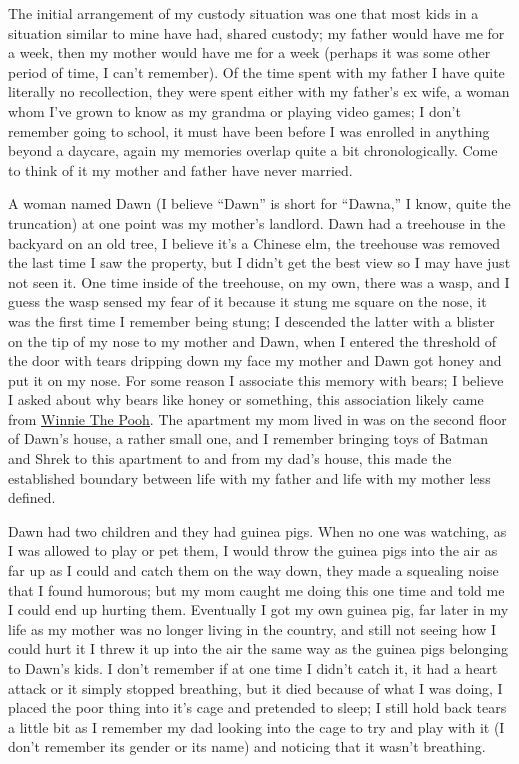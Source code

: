 \documentclass[12pt]{article}
\begin{document}
The initial arrangement of my custody situation was one that most kids in a
situation similar to mine have had, shared custody; my father would have me for
a week, then my mother would have me for a week (perhaps it was some other
period of time, I can't remember).  Of the time spent with my father I have
quite literally no recollection, they were spent either with my father's ex
wife, a woman whom I've grown to know as my grandma or playing video games; I
don't remember going to school, it must have been before I was enrolled in
anything beyond a daycare, again my memories overlap quite a bit
chronologically.  Come to think of it my mother and father have never married.

A woman named Dawn (I believe ``Dawn'' is short for ``Dawna,'' I know, quite
the truncation) at one point was my mother's landlord.  Dawn had a treehouse in
the backyard on an old tree, I believe it's a Chinese elm, the treehouse was
removed the last time I saw the property, but I didn't get the best view so I
may have just not seen it.  One time inside of the treehouse, on my own, there
was a wasp, and I guess the wasp sensed my fear of it because it stung me
square on the nose, it was the first time I remember being stung; I descended
the latter with a blister on the tip of my nose to my mother and Dawn, when I
entered the threshold of the door with tears dripping down my face my mother
and Dawn got honey and put it on my nose.  For some reason I associate this
memory with bears; I believe I asked about why bears like honey or something,
this association likely came from
{\color{blue}\underline{\href{https://winniethepooh.disney.com/}{Winnie The
Pooh}}}.  The apartment my mom lived in was on the second floor of Dawn's
house, a rather small one, and I remember bringing toys of Batman and Shrek to
this apartment to and from my dad's house, this made the established boundary
between life with my father and life with my mother less defined.

Dawn had two children and they had guinea pigs. When no one was watching, as
I was allowed to play or pet them, I would throw the guinea pigs into the air as
far up as I could and catch them on the way down, they made a squealing noise
that I found humorous; but my mom caught me doing this one time and told me
I could end up hurting them.  Eventually I got my own guinea pig, far later in
my life as my mother was no longer living in the country, and still not seeing
how I could hurt it I threw it up into the air the same way as the guinea pigs
belonging to Dawn's kids.  I don't remember if at one time I didn't catch it, it
had a heart attack or it simply stopped breathing, but it died because of what
I was doing, I placed the poor thing into it's cage and pretended to sleep;
I still hold back tears a little bit as I remember my dad looking into the cage
to try and play with it (I don't remember its gender or its name) and noticing
that it wasn't breathing.
\end{document}
